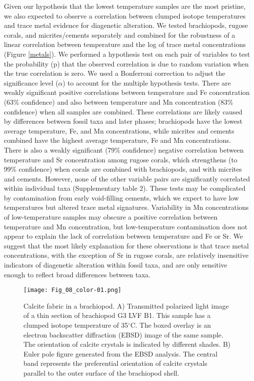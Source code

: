 \documentclass[5p, authoryear]{elsarticle}
\begin{document}
Given our hypothesis that the lowest temperature samples are the most pristine, we also expected to observe a correlation between clumped isotope temperatures and trace metal evidence for diagenetic alteration. We tested brachiopods, rugose corals, and micrites/cements separately and combined for the robustness of a linear correlation between temperature and the log of trace metal concentrations (Figure \ref{metals}). We performed a hypothesis test on each pair of variables to test the probability (p) that the observed correlation is due to random variation when the true correlation is zero. We used a Bonferroni correction to adjust the significance level ($\alpha$) to account for the multiple hypothesis tests. There are weakly significant positive correlations between temperature and Fe concentration (63\% confidence) and also between temperature and Mn concentration (83\% confidence) when all samples are combined. These correlations are likely caused by differences between fossil taxa and later phases; brachiopods have the lowest average temperature, Fe, and Mn concentrations, while micrites and cements combined have the highest average temperature, Fe and Mn concentrations. There is also a weakly significant (79\% confidence) negative correlation between temperature and Sr concentration among rugose corals, which strengthens (to 99\% confidence) when corals are combined with brachiopods, and with micrites and cements. However, none of the other variable pairs are significantly correlated within individual taxa (Supplementary table 2). These tests may be complicated by contamination from early void-filling cements, which we expect to have low temperatures but altered trace metal signatures. Variability in Mn concentrations of low-temperature samples may obscure a positive correlation between temperature and Mn concentration, but low-temperature contamination does not appear to explain the lack of correlation between temperature and Fe or Sr. We suggest that the most likely explanation for these observations is that trace metal concentrations, with the exception of Sr in rugose corals, are relatively insensitive indicators of diagenetic alteration within fossil taxa, and are only sensitive enough to reflect broad differences between taxa. 

\begin{figure*}[tb]
\centering
\texttt{[image: Fig\_08\_color-01.png]}
\caption{Calcite fabric in a brachiopod. A) Transmitted polarized light image of a thin section of brachiopod G3 LVF B1. This sample has a clumped isotope temperature of 35$^{\circ}$C. The boxed overlay is an electron backscatter diffraction (EBSD) image of the same sample. The orientation of calcite crystals is indicated by different shades. B) Euler pole figure generated from the EBSD analysis. The central band represents the preferential orientation of calcite crystals parallel to the outer surface of the brachiopod shell.}
\label{EBSD_brach}
\end{figure*}
\end{document}
